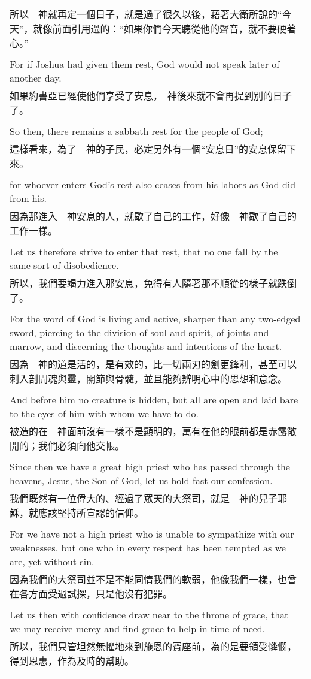\documentclass{book}
\begin{document}
\begin{tabularx}{\textwidth}{p{}}
所以　神就再定一個日子，就是過了很久以後，藉著大衛所說的“今天”，就像前面引用過的：“如果你們今天聽從他的聲音，就不要硬著心。” \\ \\
For if Joshua had given them rest, God would not speak later of another day. \\
如果約書亞已經使他們享受了安息，　神後來就不會再提到別的日子了。 \\ \\
So then, there remains a sabbath rest for the people of God; \\
這樣看來，為了　神的子民，必定另外有一個“安息日”的安息保留下來。 \\ \\
for whoever enters God's rest also ceases from his labors as God did from his. \\
因為那進入　神安息的人，就歇了自己的工作，好像　神歇了自己的工作一樣。 \\ \\
Let us therefore strive to enter that rest, that no one fall by the same sort of disobedience. \\
所以，我們要竭力進入那安息，免得有人隨著那不順從的樣子就跌倒了。 \\ \\
For the word of God is living and active, sharper than any two-edged sword, piercing to the division of soul and spirit, of joints and marrow, and discerning the thoughts and intentions of the heart. \\
因為　神的道是活的，是有效的，比一切兩刃的劍更鋒利，甚至可以刺入剖開魂與靈，關節與骨髓，並且能夠辨明心中的思想和意念。 \\ \\
And before him no creature is hidden, but all are open and laid bare to the eyes of him with whom we have to do. \\
被造的在　神面前沒有一樣不是顯明的，萬有在他的眼前都是赤露敞開的；我們必須向他交帳。 \\ \\
Since then we have a great high priest who has passed through the heavens, Jesus, the Son of God, let us hold fast our confession. \\
我們既然有一位偉大的、經過了眾天的大祭司，就是　神的兒子耶穌，就應該堅持所宣認的信仰。 \\ \\
For we have not a high priest who is unable to sympathize with our weaknesses, but one who in every respect has been tempted as we are, yet without sin. \\
因為我們的大祭司並不是不能同情我們的軟弱，他像我們一樣，也曾在各方面受過試探，只是他沒有犯罪。 \\ \\
Let us then with confidence draw near to the throne of grace, that we may receive mercy and find grace to help in time of need. \\
所以，我們只管坦然無懼地來到施恩的寶座前，為的是要領受憐憫，得到恩惠，作為及時的幫助。 \\ \\

\hline
\end{tabularx}
\end{document}
